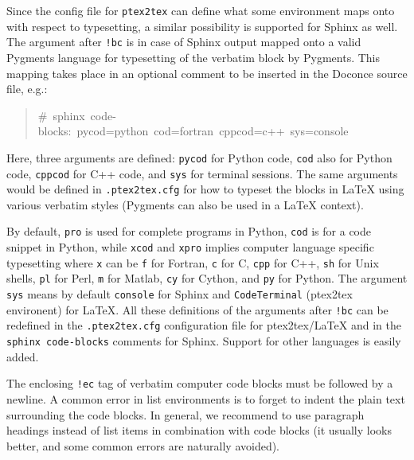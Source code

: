 \documentclass[a4paper]{article}
\begin{document}
Since the config file for \texttt{ptex2tex} can define what some environment
maps onto with respect to typesetting, a similar possibility is
supported for Sphinx as well.  The argument after \texttt{!bc} is in case of
Sphinx output mapped onto a valid Pygments language for typesetting of
the verbatim block by Pygments. This mapping takes place in an
optional comment to be inserted in the Doconce source file, e.g.:
%
\begin{quote}{\ttfamily \raggedright \noindent
\#~sphinx~code-blocks:~pycod=python~cod=fortran~cppcod=c++~sys=console
}
\end{quote}

Here, three arguments are defined: \texttt{pycod} for Python code,
\texttt{cod} also for Python code, \texttt{cppcod} for C++ code, and \texttt{sys}
for terminal sessions. The same arguments would be defined
in \texttt{.ptex2tex.cfg} for how to typeset the blocks in LaTeX using
various verbatim styles (Pygments can also be used in a LaTeX
context).

By default, \texttt{pro} is used for complete programs in Python, \texttt{cod}
is for a code snippet in Python, while \texttt{xcod} and \texttt{xpro} implies
computer language specific typesetting where \texttt{x} can be
\texttt{f} for Fortran, \texttt{c} for C, \texttt{cpp} for C++, \texttt{sh} for Unix shells,
\texttt{pl} for Perl, \texttt{m} for Matlab, \texttt{cy} for Cython, and \texttt{py} for Python.
The argument \texttt{sys} means by default \texttt{console} for Sphinx and
\texttt{CodeTerminal} (ptex2tex environent) for LaTeX. All these definitions
of the arguments after \texttt{!bc} can be redefined in the \texttt{.ptex2tex.cfg}
configuration file for ptex2tex/LaTeX and in the \texttt{sphinx code-blocks}
comments for Sphinx. Support for other languages is easily added.





The enclosing \texttt{!ec} tag of verbatim computer code blocks must
be followed by a newline.  A common error in list environments is to
forget to indent the plain text surrounding the code blocks. In
general, we recommend to use paragraph headings instead of list items
in combination with code blocks (it usually looks better, and some
common errors are naturally avoided).
\end{document}
